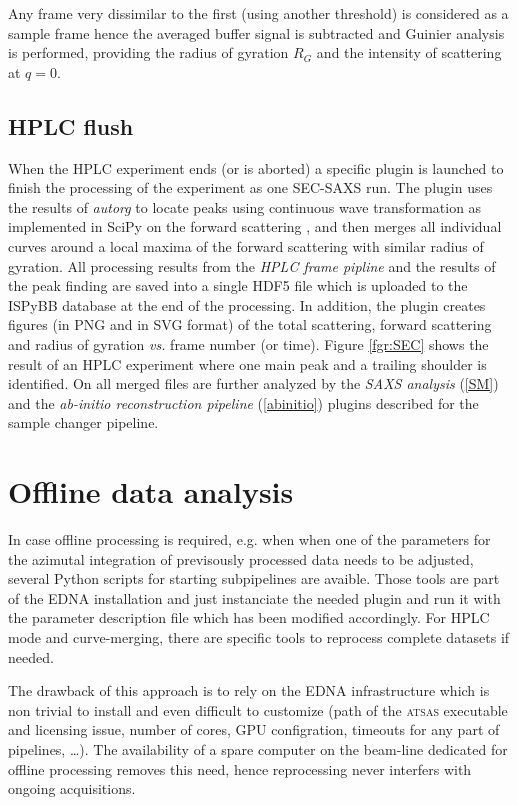 \documentclass[preprint,pdf]{iucr}              %
\begin{document}
Any frame very dissimilar to the first (using another threshold) is considered
as a sample frame hence the averaged buffer signal is subtracted and Guinier
analysis is performed, providing the radius of gyration $R_G$ and the 
intensity of scattering at $q=0$. 

\subsection{HPLC flush}
When the HPLC experiment ends (or is aborted) a specific plugin is launched to
finish the processing of the experiment as one SEC-SAXS run. 
The plugin uses the results of \textit{autorg} to locate peaks using continuous
wave transformation as implemented in SciPy on the forward scattering
\cite{cwt,scipy}, and then merges all individual curves around a local maxima
of the forward scattering with similar radius of gyration. 
All processing results from the \textit{HPLC frame pipline} and the results of 
the peak finding are saved into a single HDF5 file which is uploaded to the
ISPyBB database at the end of the processing. 
In addition, the plugin creates figures (in PNG and in SVG format) of the
total scattering, forward scattering and radius of gyration \textit{vs.} frame
number (or time). 
Figure \ref{fgr:SEC} shows the result of an HPLC 
experiment where one main peak and a trailing shoulder is identified.
On all merged files are further analyzed by the \textit{SAXS analysis}
(\ref{SM}) and the \textit{ab-initio reconstruction pipeline}
(\ref{abinitio}) plugins described for the sample changer pipeline.

\section{Offline data analysis}
In case offline processing is required, e.g. when when one of the parameters for
the azimutal integration of previsously processed data needs to be adjusted, 
several Python scripts for starting subpipelines are avaible. 
Those tools are part of the EDNA installation and just instanciate the needed
plugin and run it with the parameter description file which has been modified
accordingly. 
For HPLC mode and curve-merging, there are specific tools to reprocess complete
datasets if needed.

The drawback of this approach is to rely on the EDNA infrastructure which is
non trivial to install and even difficult to customize (path of the
\textsc{atsas} executable and licensing issue, number of cores, GPU
configration, timeouts for any part of pipelines, \ldots). 
The availability of a spare computer on the beam-line dedicated for offline
processing removes this need, hence reprocessing never interfers with ongoing
acquisitions.
\end{document}
